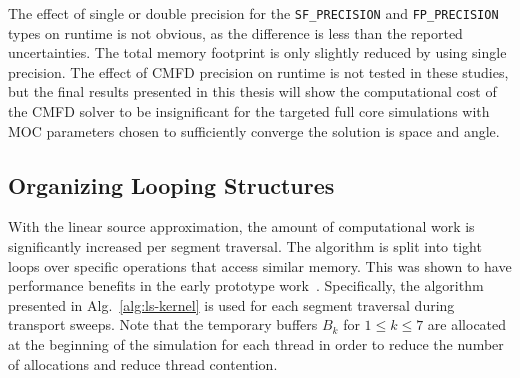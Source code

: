 The effect of single or double precision for the \texttt{SF_PRECISION} and \texttt{FP_PRECISION} types on runtime is not obvious, as the difference is less than the reported uncertainties. The total memory footprint is only slightly reduced by using single precision. The effect of \ac{CMFD} precision on runtime is not tested in these studies, but the final results presented in this thesis will show the computational cost of the \ac{CMFD} solver to be insignificant for the targeted full core simulations with \ac{MOC} parameters chosen to sufficiently converge the solution is space and angle.

\subsection{Organizing Looping Structures}

With the linear source approximation, the amount of computational work is significantly increased per segment traversal. The algorithm is split into tight loops over specific operations that access similar memory. This was shown to have performance benefits in the early prototype work~\cite{simplemoc}. Specifically, the algorithm presented in Alg.~\ref{alg:ls-kernel} is used for each segment traversal during transport sweeps. Note that the temporary buffers $B_k$ for $1 \leq k \leq 7$ are allocated at the beginning of the simulation for each thread in order to reduce the number of allocations and reduce thread contention.

